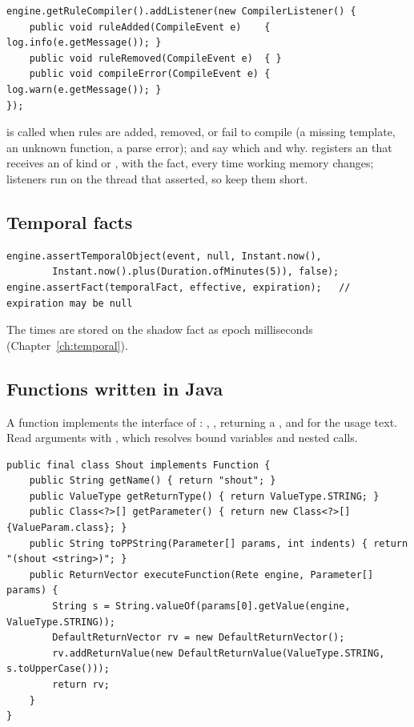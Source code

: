\begin{lstlisting}[style=java]
engine.getRuleCompiler().addListener(new CompilerListener() {
    public void ruleAdded(CompileEvent e)    { log.info(e.getMessage()); }
    public void ruleRemoved(CompileEvent e)  { }
    public void compileError(CompileEvent e) { log.warn(e.getMessage()); }
});
\end{lstlisting}

 is called when rules are added, removed, or fail
to compile (a missing template, an unknown function, a parse error);
 and  say which and why.
 registers an  that
receives an  of kind  or , with
the fact, every time working memory changes; listeners run on the thread
that asserted, so keep them short.

\subsection{Temporal facts}

\begin{lstlisting}[style=java]
engine.assertTemporalObject(event, null, Instant.now(),
        Instant.now().plus(Duration.ofMinutes(5)), false);
engine.assertFact(temporalFact, effective, expiration);   // expiration may be null
\end{lstlisting}

The times are stored on the shadow fact as epoch milliseconds
(Chapter~\ref{ch:temporal}).

\subsection{Functions written in Java}

A function implements the  interface of
: , ,
 returning a ,
 and  for the usage text. Read arguments with , which resolves bound variables and nested calls.

\begin{lstlisting}[style=java]
public final class Shout implements Function {
    public String getName() { return "shout"; }
    public ValueType getReturnType() { return ValueType.STRING; }
    public Class<?>[] getParameter() { return new Class<?>[] {ValueParam.class}; }
    public String toPPString(Parameter[] params, int indents) { return "(shout <string>)"; }
    public ReturnVector executeFunction(Rete engine, Parameter[] params) {
        String s = String.valueOf(params[0].getValue(engine, ValueType.STRING));
        DefaultReturnVector rv = new DefaultReturnVector();
        rv.addReturnValue(new DefaultReturnValue(ValueType.STRING, s.toUpperCase()));
        return rv;
    }
}
\end{lstlisting}

